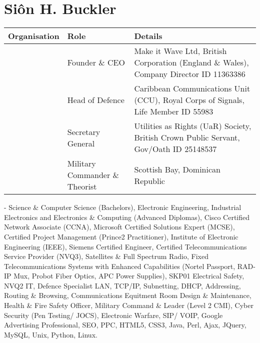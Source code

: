 \documentclass[letterpaper,10pt,english]{sphinxmanual}
\begin{document}
\section{Siôn H. Buckler}
\label{\detokenize{index:sion-h-buckler}}

\begin{savenotes}\sphinxattablestart
\centering
\begin{tabulary}{\linewidth}[t]{|T|T|T|}
\hline
\sphinxstyletheadfamily 
Organisation
&\sphinxstyletheadfamily 
Role
&\sphinxstyletheadfamily 
Details
\\
\hline
\noindent{}
&
Founder \& CEO
&
Make it Wave Ltd, British Corporation (England \& Wales), Company Director ID 11363386
\\
\hline
\noindent{}
&
Head of Defence
&
Caribbean Communications Unit (CCU), Royal Corps of Signals, Life Member ID 55983
\\
\hline
\noindent{}
&
Secretary General
&
Utilities as Rights (UaR) Society, British Crown Public Servant, Gov/Oath ID 25148537
\\
\hline
\noindent{}
&
Military Commander \& Theorist
&
Scottish Bay, Dominican Republic
\\
\hline
\end{tabulary}
\par
\sphinxattableend\end{savenotes}

 - Science \& Computer Science (Bachelors), Electronic Engineering, Industrial Electronics and Electronics \& Computing (Advanced Diplomas), Cisco Certified Network Associate (CCNA), Microsoft Certified Solutions Expert (MCSE), Certified Project Management (Prince2 Practitioner), Institute of Electronic Engineering (IEEE), Siemens Certified Engineer, Certified Telecommunications Service Provider (NVQ3), Satellites \& Full Spectrum Radio, Fixed Telecommunications Systems with Enhanced Capabilities (Nortel Passport, RAD-IP Mux, Probot Fiber Optics, APC Power Supplies), SKP01 Electrical Safety, NVQ2 IT, Defence Specialist LAN, TCP/IP, Subnetting, DHCP, Addressing, Routing \& Browsing, Communications Equitment Room Design \& Maintenance, Health \& Fire Safety Officer, Military Command \& Leader (Level 2 CMI),  Cyber Security (Pen Testing/ JOCS), Electronic Warfare, SIP/ VOIP, Google Advertising Professional, SEO, PPC, HTML5, CSS3, Java, Perl, Ajax, JQuery, MySQL, Unix, Python, Linux.



\renewcommand{\indexname}{Index}
\printindex
\end{document}
